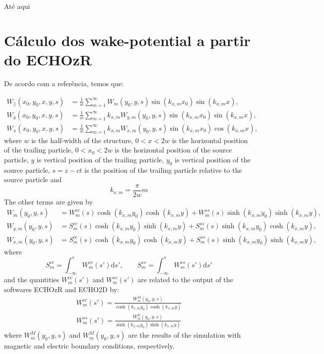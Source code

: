 {\huge Até aqui}

\section{Cálculo dos wake-potential a partir do ECHOzR}

De acordo com a referência, temos que:

\begin{align}
W_{||}(x_0,y_0,x,y,s) &= \frac1w\sum_{m=1}^\infty W_m(y_0,y,s)\sin(k_{x,m}x_0)\sin(k_{x,m}x), \\
W_y(x_0,y_0,x,y,s) &= \frac1w\sum_{m=1}^\infty k_{x,m}W_{y,m}(y_0,y,s)\sin(k_{x,m}x_0)\sin(k_{x,m}x), \\
W_x(x_0,y_0,x,y,s) &= \frac1w\sum_{m=1}^\infty k_{x,m}W_{x,m}(y_0,y,s)\sin(k_{x,m}x_0)\cos(k_{x,m}x),
\end{align}
where $w$ is the half-width of the structure, $0<x<2w$ is the horizontal position of the trailing particle, $0<x_0<2w$ is the horizontal position of the source particle, $y$ is vertical position of the trailing particle, $y_0$ is vertical position of the source particle, $s=z-ct$ is the position of the trailing particle relative to the source particle and 
\begin{equation}
k_{x,m} = \frac{\pi}{2w}m
\end{equation}
The other terms are given by
\begin{align}
W_m(y_0,y,s)     &= W^{cc}_m(s)\cosh(k_{x,m}y_0)\cosh(k_{x,m}y) + W^{ss}_m(s)\sinh(k_{x,m}y_0)\sinh(k_{x,m}y), \\
W_{y,m}(y_0,y,s) &= S^{cc}_m(s)\cosh(k_{x,m}y_0)\sinh(k_{x,m}y) + S^{ss}_m(s)\sinh(k_{x,m}y_0)\cosh(k_{x,m}y), \\
W_{x,m}(y_0,y,s) &= S^{cc}_m(s)\cosh(k_{x,m}y_0)\cosh(k_{x,m}y) + S^{ss}_m(s)\sinh(k_{x,m}y_0)\sinh(k_{x,m}y), 
\end{align}
where
\begin{equation}
S^{cc}_m = \int_{-\infty}^s W^{cc}_m(s')\mathrm{d}s', \qquad S^{ss}_m = \int_{-\infty}^s W^{ss}_m(s')\mathrm{d}s'
\end{equation}
and the quantities $W^{cc}_m(s')$ and $W^{ss}_m(s')$ are related to the output of the softwares ECHOzR and ECHO2D by:
\begin{align}
W^{cc}_m(s') = \frac{W_m^M(y_0,y,s)}{\cosh(k_{x,m}y_0)\cosh(k_{x,m}y)} \\
W^{ss}_m(s') = \frac{W_m^E(y_0,y,s)}{\sinh(k_{x,m}y_0)\sinh(k_{x,m}y)}
\end{align}
where $W_m^M(y_0,y,s)$ and $W_m^M(y_0,y,s)$ are the results of the simulation with magnetic and electric boundary conditions, respectively.



